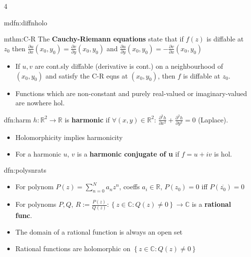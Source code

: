 \documentclass[landscape, 8pt]{extarticle}
\begin{document}
\begin{multicols*}{4}
\begin{mdfn}{mdfn:diffnholo}{ }
		\end{mdfn}
		
		
		\begin{mthm}{mthm:C-R}{ }
			The \textbf{Cauchy-Riemann equations} state that if $f(z)$ is diffable at $z_0$ then $\frac{\partial u}{\partial x}(x_0, y_0) = \frac{\partial  v}{\partial  y}(x_0, y_0)$ and $\frac{\partial  u}{\partial  y}(x_0, y_0) = - \frac{\partial  v}{\partial  x}(x_0, y_0)$
			
			\begin{itemize}
				\item If $u, v$ are cont.sly diffable (derivative is cont.) on a neighbourhood of $(x_0, y_0)$ and satisfy the C-R eqns at $(x_0, y_0)$, then $f$ is diffable at $z_0$.
				\item Functions which are non-constant and purely real-valued or imaginary-valued are nowhere hol.
			
			\end{itemize}
			
		\end{mthm}
		
		
		\begin{dfn}{dfn:harm}{ }
			$h: \mathbb{R}^2 \to \mathbb{R}$ is \textbf{harmonic} if $\forall (x, y) \in \mathbb{R}^2$: $\frac{\partial^2 h}{\partial x^2} + \frac{\partial^2 h}{\partial y^2} = 0$ (Laplace).
			\begin{itemize}
				\item Holomorphicity implies harmonicity
				\item For a harmonic $u$, $v$ is a \textbf{harmonic conjugate of u} if $f = u + iv$ is hol.
			\end{itemize}
			
		\end{dfn}
		
		
		\begin{dfn}{dfn:polysnrats}{ }
			\begin{itemize}
				\item For polynom $P(z) = \sum_{n=0}^{N} a_n z^n$, coeffs $a_i \in \mathbb{R}$, $P(z_0) = 0$ iff $P(\overline{z_0}) = 0$
				\item For polynoms $P, Q$, $R:= \frac{P(z)}{Q(z)}: \left\{z \in \mathbb{C}: Q(z) \ne 0\right\} \to \mathbb{C}$ is a \textbf{rational func}.
				\item The domain of a rational function is always an open set
				\item Rational functions are holomorphic on $\left\{z \in \mathbb{C}: Q(z) \ne 0\right\}$
			\end{itemize}
			

\end{dfn}
\end{multicols*}
\end{document}
